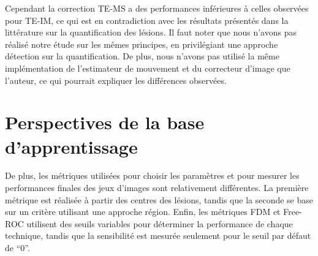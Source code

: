 Cependant la correction TE-MS a des performances inférieures à celles observées pour TE-IM, ce qui est en contradiction avec les résultats présentés dans la littérature sur la quantification des lésions. Il faut noter que nous n'avons pas réalisé notre étude sur les mêmes principes, en privilégiant une approche détection sur la quantification. De plus, nous n'avons pas utilisé la même implémentation de l'estimateur de mouvement et du correcteur d'image que l'auteur, ce qui pourrait expliquer les différences observées.


% 
% 
% 

\section{Perspectives de la base d'apprentissage}


De plus, les métriques utilisées pour choisir les paramètres et pour mesurer les performances finales des jeux d'images sont relativement différentes. La première métrique est réalisée à partir des centres des lésions, tandis que la seconde se base sur un critère utilisant une approche région. Enfin, les métriques FDM et Free-ROC utilisent des seuils variables pour déterminer la performance de chaque technique, tandis que la sensibilité est mesurée seulement pour le seuil par défaut de ``0''.

